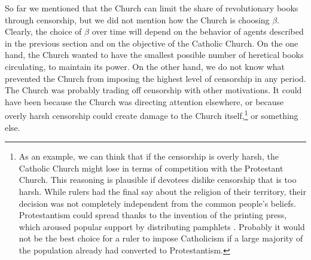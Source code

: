 So far we mentioned that the Church can limit the share of revolutionary books through censorship, but we did not mention how the Church is choosing $\beta$. Clearly, the choice of  $\beta$ over time will depend on the behavior of agents described in the previous section and on the objective of the Catholic Church. On the one hand, the Church wanted to have the smallest possible number of heretical books circulating, to maintain its power. On the other hand, we do not know what prevented the Church from imposing the highest level of censorship in any period. The Church was probably trading off censorship with other motivations. It could have been because the Church was directing attention elsewhere, or because overly harsh censorship could create damage to the Church itself,\footnote{As an example, we can think that if the censorship is overly harsh, the Catholic Church might lose in terms of competition with the Protestant Church. This reasoning is plausible if devotees dislike censorship that is too harsh. While rulers had the final say about the religion of their territory, their decision was not completely independent from the common people's beliefs. Protestantism could spread thanks to the invention of the printing press, which aroused popular support by distributing pamphlets \cite{eisenstein1980,rubin2014}. Probably it would not be the best choice for a ruler to impose Catholicism if a large majority of the population already had converted to Protestantism.} or something else.

